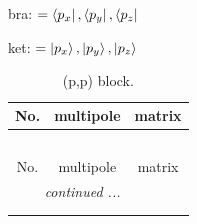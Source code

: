 \documentclass[fleqn,8pt,landscape]{jsarticle}
\begin{document}
bra: $=\bra{p_{x}}, \bra{p_{y}}, \bra{p_{z}}$

\noindent
ket: $=\ket{p_{x}}, \ket{p_{y}}, \ket{p_{z}}$
\renewcommand{\arraystretch}{1.6}
\begin{longtable}{ccc}
\caption{(p,p) block.}
 \\
 \hline \hline
No. & multipole & matrix \\ \hline \endfirsthead

\multicolumn{2}{l}{\tablename\ \thetable{}} \\
 \hline \hline
No. & multipole & matrix \\ \hline \endhead

 \hline \hline
\multicolumn{2}{r}{\footnotesize\it continued ...} \\ \endfoot

 \hline \hline
\multicolumn{2}{r}{} \\ \endlastfoot


\end{longtable}
\end{document}
